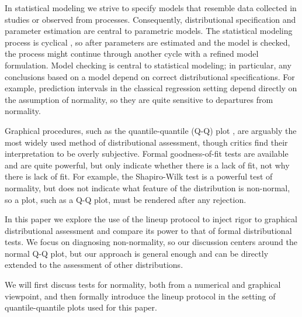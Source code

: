 \documentclass{article}\usepackage[]{graphicx}\usepackage[]{color}
\newcommand{\alnote}[1]{\todo[inline,color=green!40]{#1}}
\newcommand{\hhnote}[1]{\todo[inline,color=magenta!40]{#1}}
\begin{document}
In statistical modeling we strive to specify models that resemble data collected in studies or observed from processes. Consequently, %
distributional specification and parameter estimation are central to parametric models.
The statistical modeling process is cyclical \citep{tukey:eda}, so after parameters are estimated and the model is checked, the process might continue through another cycle with a refined model formulation. Model checking is central to statistical modeling; in particular, any conclusions based on a model depend  on  correct distributional specifications. For example, prediction intervals in the classical regression setting depend directly on the assumption of normality, so they are quite sensitive to departures from normality. 

Graphical procedures, such as the quantile-quantile (Q-Q) plot \citep{Wilk:1968}, are arguably the most widely used method of distributional assessment, though critics find their interpretation to be overly subjective. Formal goodness-of-fit tests are available and are quite powerful, but only indicate whether there is a lack of fit, not why there is lack of fit. For example, the Shapiro-Wilk test \citep{Shapiro:1965kt} is a powerful test of normality, but does not indicate what feature of the distribution is non-normal, so a plot, such as a Q-Q plot, must be rendered after any rejection. 

In this paper we explore the use of the lineup protocol \citep{buja:2009hp} to inject rigor to graphical distributional assessment and compare its power to that of formal distributional tests. We focus on diagnosing non-normality, so our discussion centers around the normal Q-Q plot, but our approach is general enough and can be directly extended to the assessment of other distributions.


We will first discuss  tests for normality, both from a numerical and graphical viewpoint, and then formally introduce the lineup protocol in the setting of quantile-quantile plots used for this paper.

\end{document}
